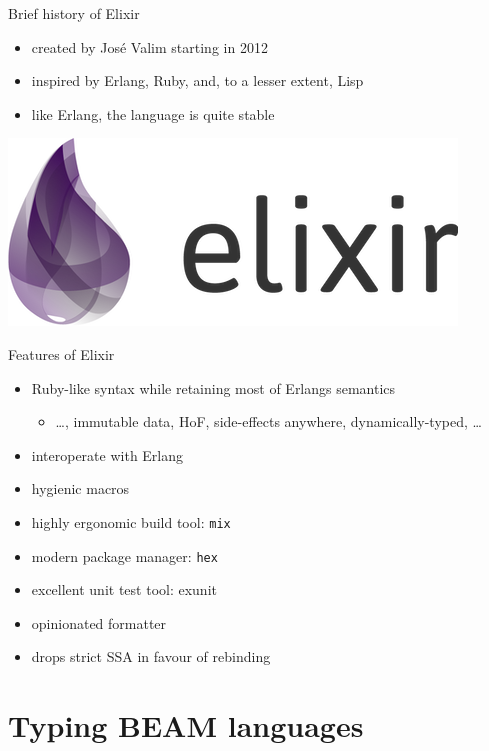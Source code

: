 \documentclass[
  ignorenonframetext,
  aspectratio=169]{beamer}
\newcommand{\passthrough}[1]{#1}
\providecommand{\tightlist}{%
  \setlength{\itemsep}{0pt}\setlength{\parskip}{0pt}}
\begin{document}
\begin{frame}{Brief history of Elixir}
\label{brief-history-of-elixir}
\begin{itemize}
\tightlist
\item
  created by José Valim starting in 2012
\item
  inspired by Erlang, Ruby, and, to a lesser extent, Lisp
\item
  like Erlang, the language is quite stable
\end{itemize}

\begin{center}
\includegraphics[width=.5\textwidth]{./img/elixir_logo.png}
\end{center}
\end{frame}

\begin{frame}[fragile]{Features of Elixir}
\label{features-of-elixir}
\begin{itemize}
\tightlist
\item
  Ruby-like syntax while retaining most of Erlang\textquotesingle s
  semantics

  \begin{itemize}
  \tightlist
  \item
    \ldots, immutable data, HoF, side-effects anywhere,
    dynamically-typed, \ldots{}
  \end{itemize}
\item
  interoperate with Erlang
\item
  hygienic macros
\item
  highly ergonomic build tool: \passthrough{\lstinline!mix!}
\item
  modern package manager: \passthrough{\lstinline!hex!}
\item
  excellent unit test tool: exunit
\item
  opinionated formatter
\item
  drops strict SSA in favour of rebinding
\end{itemize}
\end{frame}

\section{Typing BEAM languages}\label{typing-beam-languages}
\end{document}
